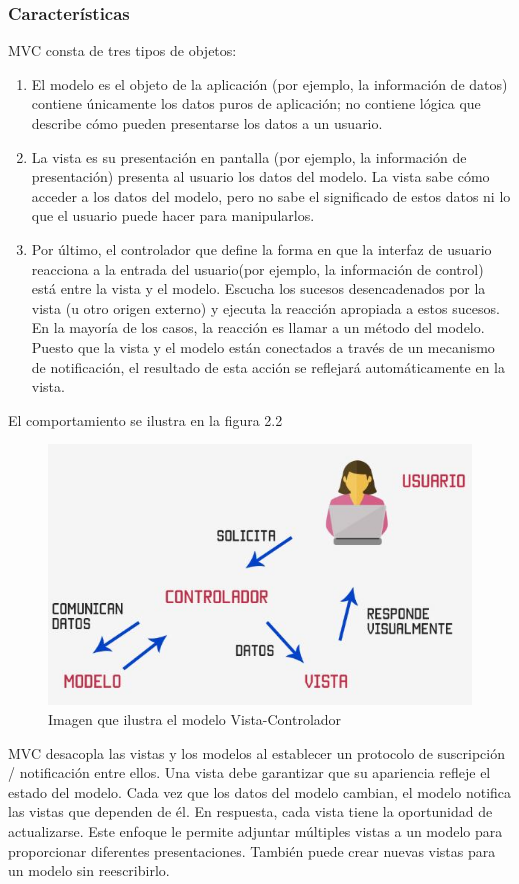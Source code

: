 \subsubsection{Características}
MVC consta de tres tipos de objetos:
\begin{enumerate}
\item El modelo es el objeto de la aplicación (por ejemplo, la información de datos) contiene únicamente los datos puros de aplicación; no contiene lógica que describe cómo pueden presentarse los datos a un usuario.
\item La vista es su presentación en pantalla  (por ejemplo, la información de presentación) presenta al usuario los datos del modelo. La vista sabe cómo acceder a los datos del modelo, pero no sabe el significado de estos datos ni lo que el usuario puede hacer para manipularlos.
\item Por último, el controlador que  define la forma en que la interfaz de usuario reacciona a la entrada del usuario(por ejemplo, la información de control) está entre la vista y el modelo. Escucha los sucesos desencadenados por la vista (u otro origen externo) y ejecuta la reacción apropiada a estos sucesos. En la mayoría de los casos, la reacción es llamar a un método del modelo. Puesto que la vista y el modelo están conectados a través de un mecanismo de notificación, el resultado de esta acción se reflejará automáticamente en la vista.
\end{enumerate}

El comportamiento se ilustra en la figura 2.2\\
\begin{figure}[H]
	\begin{center}
		\includegraphics[width=.65\textwidth]{images/marcoteorico/mvc}
		\caption{Imagen que ilustra el modelo Vista-Controlador}
		\label{fig:mvc}
	\end{center}
\end{figure}

MVC desacopla las vistas y los modelos al establecer un protocolo de suscripción / notificación entre ellos. Una vista debe garantizar que su apariencia refleje el estado del modelo. Cada vez que los datos del modelo cambian, el modelo notifica las vistas que dependen de él. En respuesta, cada vista tiene la oportunidad de actualizarse. Este enfoque le permite adjuntar múltiples vistas a un modelo para proporcionar diferentes presentaciones. También puede crear nuevas vistas para un modelo sin reescribirlo.\\

